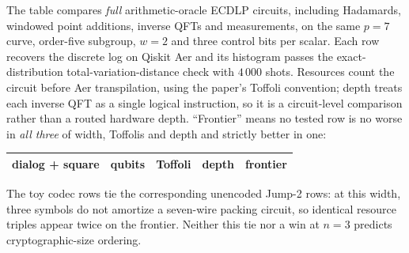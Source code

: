 The table compares \emph{full} arithmetic-oracle ECDLP circuits, including
Hadamards, windowed point additions, inverse QFTs and measurements, on the same
$p=7$ curve, order-five subgroup, $w=2$ and three control bits per scalar.
Each row recovers the discrete log on Qiskit Aer and its histogram passes the
exact-distribution total-variation-distance check with $4\,000$ shots.
Resources count the circuit before Aer transpilation, using the paper's
Toffoli convention; depth treats each inverse QFT as a single logical
instruction, so it is a circuit-level comparison rather than a routed
hardware depth. ``Frontier'' means no tested row is no worse in
\emph{all three} of width, Toffolis and depth and strictly better in one:
\begin{center}\footnotesize\setlength{\tabcolsep}{3pt}
\begin{tabular}{@{}lrrrr@{}}
\toprule
dialog + square & qubits & Toffoli & depth & frontier\\
\midrule
\bottomrule
\end{tabular}
\end{center}

The toy codec rows tie the corresponding unencoded Jump-2 rows: at this
width, three symbols do not amortize a seven-wire packing circuit, so
identical resource triples appear twice on the frontier. Neither this tie
nor a win at $n=3$ predicts cryptographic-size ordering.

